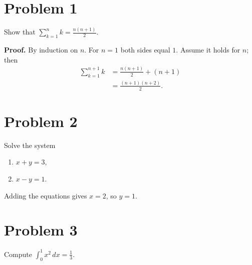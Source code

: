 \documentclass{article}
\begin{document}
\section*{Problem 1}
Show that $\sum_{k=1}^{n} k = \frac{n(n+1)}{2}$.

\textbf{Proof.} By induction on $n$. For $n=1$ both sides equal $1$. Assume it
holds for $n$; then
\begin{align*}
  \sum_{k=1}^{n+1} k &= \frac{n(n+1)}{2} + (n+1) \\
                     &= \frac{(n+1)(n+2)}{2}.
\end{align*}

\section*{Problem 2}
Solve the system
\begin{enumerate}
  \item $x + y = 3$,
  \item $x - y = 1$.
\end{enumerate}
Adding the equations gives $x = 2$, so $y = 1$.

\section*{Problem 3}
Compute $\int_0^1 x^2\,dx = \frac{1}{3}$.
\end{document}
